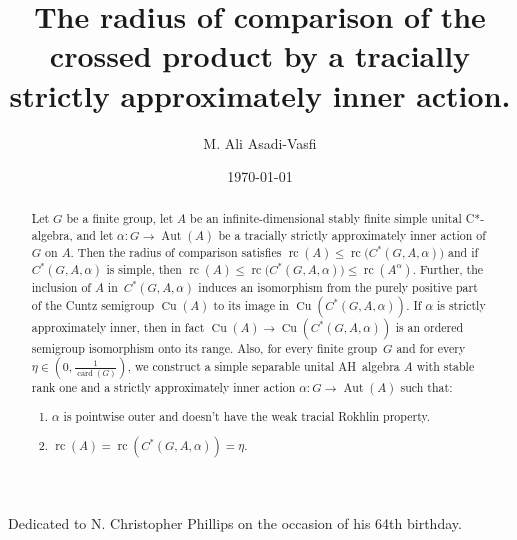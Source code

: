 \documentclass[10pt]{amsart}
\title[Radius of comparison of the crossed product]{
The radius of comparison of the crossed product by a tracially strictly approximately inner  action.}  %
\author{M. Ali Asadi-Vasfi}
\date{\today}
\numberwithin{equation}{section}
\theoremstyle{definition}
\newcommand{\af}{\alpha}
\newcommand{\Cu}{{\operatorname{Cu}}}
\newcommand{\card}{{\operatorname{card}}}
\newcommand{\Aut}{{\operatorname{Aut}}}
\newcommand{\rc}{{\operatorname{rc}}}
\newcommand{\CGAa}{C^* (G, A, \af)}
\begin{document}
\maketitle
\begin{center}
Dedicated to N. Christopher Phillips on the occasion of his 64th birthday.
\end{center}
\begin{abstract}
Let $G$ be a finite group,
let $A$ be an  infinite-dimensional stably finite simple unital C*-algebra,
and let $\alpha \colon G \to \Aut (A)$
be a tracially strictly approximately  inner action of $G$ on $A$.
Then the radius of comparison satisfies
$\rc (A) \leq   \rc \big( \CGAa \big)$ and if $C^*(G, A, \alpha)$ is simple, then
$\rc (A) \leq   \rc \big( \CGAa \big) \leq \rc (A^{\alpha})$.
Further, 
the inclusion of $A$ in~$C^*(G, A, \alpha)$
 induces an isomorphism from the purely positive part of the
 Cuntz semigroup $\Cu (A)$ to its image in $\Cu (\CGAa)$.
 If $\alpha$ is  strictly approximately inner,
 then in fact $\Cu (A) \to \Cu (\CGAa)$ is an ordered semigroup isomorphism onto
its range. Also, for every finite group~$G$ and for every  $\eta \in \left(0, \frac{1}{\card (G)}\right)$,
we construct a simple separable unital AH~algebra $A$ with stable rank one 
and a strictly approximately  inner action $\alpha \colon G \to \Aut (A)$  such that:
\begin{enumerate}
\item
$\alpha$ is pointwise outer and doesn't have the weak tracial Rokhlin property.
\item 
$\rc (A) =\rc \left(C^*(G, A, \alpha)\right)= \eta$.
\end{enumerate}
\end{abstract}

\tableofcontents

\end{document}
